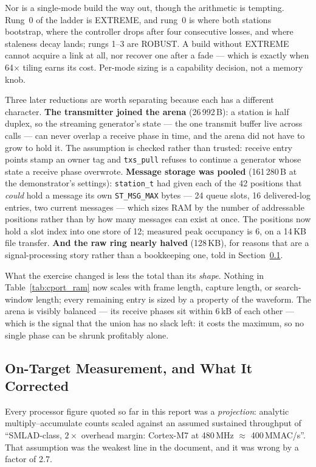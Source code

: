 Nor is a single-mode build the way out, though the arithmetic is
tempting. Rung~0 of the ladder is EXTREME, and rung~0 is where both
stations bootstrap, where the controller drops after four consecutive
losses, and where staleness decay lands; rungs 1--3 are ROBUST. A build
without EXTREME cannot acquire a link at all, nor recover one after a
fade --- which is exactly when 64$\times$ tiling earns its cost.
Per-mode sizing is a capability decision, not a memory knob.

Three later reductions are worth separating because each has a
different character. \textbf{The transmitter joined the arena}
(26\,992\,B): a station is half duplex, so the streaming generator's
state --- the one transmit buffer live across calls --- can never
overlap a receive phase in time, and the arena did not have to grow to
hold it. The assumption is checked rather than trusted: receive entry
points stamp an owner tag and \texttt{txs\_pull} refuses to continue a
generator whose state a receive phase overwrote. \textbf{Message
storage was pooled} (161\,280\,B at the demonstrator's settings):
\texttt{station\_t} had given each of the 42 positions that
\emph{could} hold a message its own \texttt{ST\_MSG\_MAX} bytes ---
24 queue slots, 16 delivered-log entries, two current messages --- which
sizes RAM by the number of addressable positions rather than by how many
messages can exist at once. The positions now hold a slot index into one
store of 12; measured peak occupancy is 6, on a 14\,KB file transfer.
\textbf{And the raw ring nearly halved} (128\,KB), for reasons that are
a signal-processing story rather than a bookkeeping one, told in
Section~\ref{sec:cport_ontarget}.

What the exercise changed is less the total than its \emph{shape}.
Nothing in Table~\ref{tab:cport_ram} now scales with frame length,
capture length, or search-window length; every remaining entry is sized
by a property of the waveform. The arena is visibly balanced --- its
receive phases sit within 6\,kB of each other --- which is the signal
that the union has no slack left: it costs the maximum, so no single
phase can be shrunk profitably alone.

\subsection{On-Target Measurement, and What It Corrected}
\label{sec:cport_ontarget}

Every processor figure quoted so far in this report was a
\emph{projection}: analytic multiply--accumulate counts scaled against
an assumed sustained throughput of ``SMLAD-class, $2\times$ overhead
margin: Cortex-M7 at 480\,MHz $\approx$ 400\,MMAC/s''. That assumption
was the weakest line in the document, and it was wrong by a factor of
2.7.

